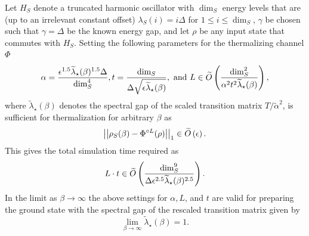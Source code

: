 \begin{theorem}\label{thm:harmonic_oscillator}
    Let $H_S$ denote a truncated harmonic oscillator with $\dim_S$ energy levels that are (up to an irrelevant constant offset) $\lambda_S(i) = i \Delta$ for $1 \le i \le \dim_S$, $\gamma$ be chosen such that $\gamma = \Delta$ be the known energy gap, and let $\rho$ be any input state that commutes with $H_S$. Setting the following parameters for the thermalizing channel $\Phi$
    \begin{equation}
        \alpha = \frac{\epsilon^{1.5} \widetilde{\lambda}_\star(\beta)^{1.5} \Delta}{\dim_S^4}, t = \frac{\dim_S}{\Delta \sqrt{\epsilon \widetilde{\lambda}_\star(\beta)}}, \text{ and } L \in \widetilde{O} \left( \frac{\dim_S^2}{\alpha^2 t^2 \widetilde{\lambda}_\star(\beta)} \right),
    \end{equation}
    where $\widetilde{\lambda}_\star(\beta)$ denotes the spectral gap of the scaled transition matrix $T / \widetilde{\alpha}^2$, is sufficient for thermalization for arbitrary $\beta$ as
    \begin{equation}
        \left| \left| \rho_S(\beta) - \Phi^{\circ L}(\rho) \right| \right|_1 \in \widetilde{O} \left( \epsilon \right).
    \end{equation}
    This gives the total simulation time required as
    \begin{equation}
        L \cdot t \in \widetilde{O} \left( \frac{\dim_S^9}{\Delta \epsilon^{2.5} \widetilde{\lambda}_\star(\beta)^{2.5}} \right).
    \end{equation}
    In the limit as $\beta \to \infty$ the above settings for $\alpha, L$, and $t$ are valid for preparing the ground state with the spectral gap of the rescaled transition matrix given by
    \begin{equation}
        \lim_{\beta \to \infty} \widetilde{\lambda}_\star(\beta) = 1.
    \end{equation}

    
\end{theorem}
